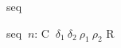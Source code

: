 \begin{tactic}{seq}
\begin{tsyntax}{seq $\ n$: C $\ \delta_1\ \delta_2\ \rho_1\ \rho_2$ R}
%  
%
%
 \end{tsyntax}
\end{tactic}
